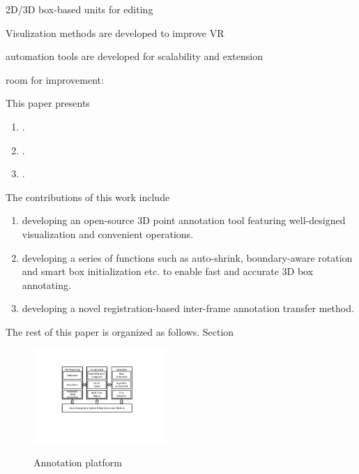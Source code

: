 \documentclass[letterpaper, 10 pt, conference]{ieeeconf}  %
\begin{document}
2D/3D box-based units for editing 

Visulization methods are developed to improve VR

automation tools are developed for scalability and extension 

room for improvement: 

This paper presents 
\begin{enumerate}
	
	\item.
	\item.
	\item.
	
\end{enumerate}

The contributions of this work include
\begin{enumerate}

	\item developing an open-source 3D point annotation tool featuring  well-designed visualization and convenient operations.
	\item developing a series of functions such as auto-shrink, boundary-aware rotation and smart box initialization etc. to enable fast and accurate 3D box annotating.
	\item developing a novel registration-based inter-frame annotation transfer method.
\end{enumerate}

The rest of this paper is organized as follows. Section


\begin{figure}[tp]
	\centering
	\includegraphics[width=0.45\textwidth]{./figures/arch}\\ %
	\caption{Annotation platform}
	\label{fig:main-arch}
	\vspace{-0.3cm}
\end{figure}
\end{document}
